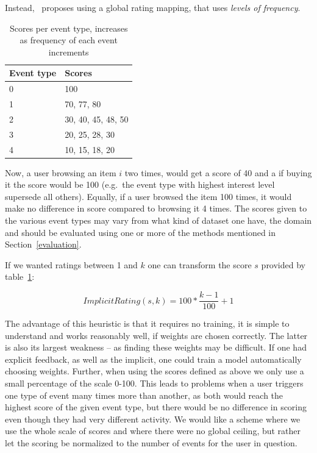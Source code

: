 Instead,~\cite{pkghost2014implicit} proposes using a global rating mapping,
that uses \textit{levels of frequency}.

\begin{table}[H]
  \centering
  \begin{tabular}{ll}
  \toprule
  Event type & Scores \\ \midrule
  0 & 100 \\
  1 & 70, 77, 80 \\
  2 & 30, 40, 45, 48, 50 \\
  3 & 20, 25, 28, 30 \\
  4 & 10, 15, 18, 20 \\
  \bottomrule
  \end{tabular}
  \caption{Scores per event type, increases as frequency of each event
           increments}
\label{implicit-table}
\end{table}

Now, a user browsing an item $i$ two times, would get a score of 40 and a if
buying it the score would be 100 (e.g.\ the event type with highest interest
level supersede all others). Equally, if a user browsed the item 100 times, it
would make no difference in score compared to browsing it 4 times. The scores
given to the various event types may vary from what kind of dataset one have,
the domain and should be evaluated using one or more of the methods mentioned
in Section~\ref{evaluation}.

If we wanted ratings between 1 and $k$ one can transform the score $s$ provided
by table~\ref{implicit-table}:

\begin{equation}
  ImplicitRating(s, k) = 100 * \frac{k-1}{100} + 1
\end{equation}

The advantage of this heuristic is that it requires no training, it is simple
to understand and works reasonably well, if weights are chosen correctly.
The latter is also its largest weakness -- as finding these weights may be
difficult. If one had explicit feedback, as well as the implicit, one could
train a model automatically choosing weights. Further, when using the scores
defined as above we only use a small percentage of the scale 0-100. This leads
to problems when a user triggers one type of event many times more than
another, as both would reach the highest score of the given event type, but
there would be no difference in scoring even though they had very different
activity. We would like a scheme where we use the whole scale of scores and
where there were no global ceiling, but rather let the scoring be normalized to
the number of events for the user in question.


